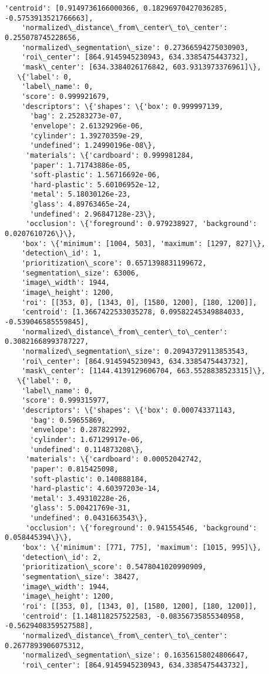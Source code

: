 \documentclass[11pt]{article}
\begin{document}
\begin{tcolorbox}[breakable, size=fbox, boxrule=.5pt, pad at break*=1mm, opacityfill=0]
\begin{Verbatim}[commandchars=\\\{\}]
    'centroid': [0.9149736166000366, 0.18296970427036285, -0.5753913521766663],
    'normalized\_distance\_from\_center\_to\_center': 0.255078745228656,
    'normalized\_segmentation\_size': 0.27366594275030903,
    'roi\_center': [864.9145945230943, 634.3385475443732],
    'mask\_center': [634.3384026176842, 603.9313973376961]\},
   \{'label': 0,
    'label\_name': 0,
    'score': 0.999921679,
    'descriptors': \{'shapes': \{'box': 0.999997139,
      'bag': 2.25283273e-07,
      'envelope': 2.61329296e-06,
      'cylinder': 1.39270359e-29,
      'undefined': 1.24990196e-08\},
     'materials': \{'cardboard': 0.999981284,
      'paper': 1.71743886e-05,
      'soft-plastic': 1.56716692e-06,
      'hard-plastic': 5.60106952e-12,
      'metal': 5.18030126e-23,
      'glass': 4.89763465e-24,
      'undefined': 2.96847128e-23\},
     'occlusion': \{'foreground': 0.979238927, 'background': 0.0207610726\}\},
    'box': \{'minimum': [1004, 503], 'maximum': [1297, 827]\},
    'detection\_id': 1,
    'prioritization\_score': 0.6571398831199672,
    'segmentation\_size': 63006,
    'image\_width': 1944,
    'image\_height': 1200,
    'roi': [[353, 0], [1343, 0], [1580, 1200], [180, 1200]],
    'centroid': [1.3667422533035278, 0.09582245349884033, -0.539046585559845],
    'normalized\_distance\_from\_center\_to\_center': 0.30821668993787227,
    'normalized\_segmentation\_size': 0.20943729113853543,
    'roi\_center': [864.9145945230943, 634.3385475443732],
    'mask\_center': [1144.4139129606704, 663.5528838523315]\},
   \{'label': 0,
    'label\_name': 0,
    'score': 0.999315977,
    'descriptors': \{'shapes': \{'box': 0.000743371143,
      'bag': 0.59655869,
      'envelope': 0.287822992,
      'cylinder': 1.67129917e-06,
      'undefined': 0.114873208\},
     'materials': \{'cardboard': 0.00052042742,
      'paper': 0.815425098,
      'soft-plastic': 0.140888184,
      'hard-plastic': 4.60397203e-14,
      'metal': 3.49310228e-26,
      'glass': 5.00421769e-31,
      'undefined': 0.0431663543\},
     'occlusion': \{'foreground': 0.941554546, 'background': 0.058445394\}\},
    'box': \{'minimum': [771, 775], 'maximum': [1015, 995]\},
    'detection\_id': 2,
    'prioritization\_score': 0.5478041020990909,
    'segmentation\_size': 38427,
    'image\_width': 1944,
    'image\_height': 1200,
    'roi': [[353, 0], [1343, 0], [1580, 1200], [180, 1200]],
    'centroid': [1.148118257522583, -0.08356735855340958, -0.5629408359527588],
    'normalized\_distance\_from\_center\_to\_center': 0.2677893906075312,
    'normalized\_segmentation\_size': 0.16356158024806647,
    'roi\_center': [864.9145945230943, 634.3385475443732],

\end{Verbatim}
\end{tcolorbox}
\end{document}

